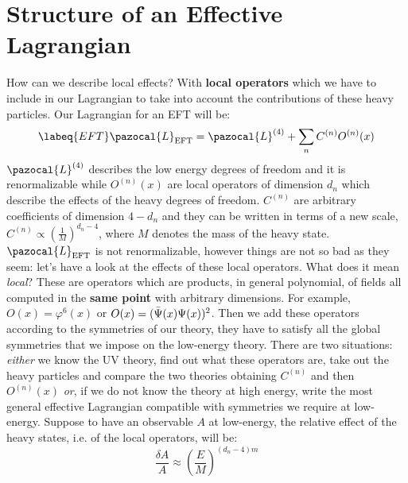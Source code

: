 \documentclass[../main.tex]{subfiles}
\begin{document}
\section{Structure of an Effective Lagrangian}
How can we describe local effects? With \textbf{local operators} which we have to include in our Lagrangian to take into account the contributions of these heavy particles. Our Lagrangian for an EFT will be:
\begin{equation}
\labeq{EFT}
\pazocal{L}_{\text{EFT}}=\pazocal{L}^{(4)}+\sum_n C^{(n)}O^{(n)}(x)
\end{equation}%
$\pazocal{L}^{(4)}$ describes the low energy degrees of freedom and it is renormalizable while $O^{(n)}(x)$ are local operators of dimension $d_n$ which describe the effects of the heavy degrees of freedom. $C^{(n)}$ are arbitrary coefficients of dimension $4-d_n$ and they can be written in terms of a new scale, $C^{(n)}\propto\left(\frac{1}{M}\right)^{d_n-4}$, where $M$ denotes the mass of the heavy state. $\pazocal{L}_{\text{EFT}}$ is not renormalizable, however things are not so bad as they seem: let's have a look at the effects of these local operators. What does it mean \textit{local}? These are operators which are products, in general polynomial, of fields all computed in the \textbf{same point} with arbitrary dimensions. For example, $O(x)=\varphi^6(x)$ or $O(x)=(\Bar{\Psi}(x)\Psi(x))^2$. Then we add these operators according to the symmetries of our theory, they have to satisfy all the global symmetries that we impose on the low-energy theory. There are two situations: \textit{either} we know the UV theory, find out what these operators are, take out the heavy particles and compare the two theories obtaining $C^{(n)}$ and then $O^{(n)}(x)$ \textit{or}, if we do not know the theory at high energy, write the most general effective Lagrangian compatible with symmetries we require at low-energy. Suppose to have an observable $A$ at low-energy, the relative effect of the heavy states, i.e. of the local operators, will be:
\[
\frac{\delta A}{A}\approx\left(\frac{E}{M}\right)^{(d_n-4)m}
\]
\end{document}
